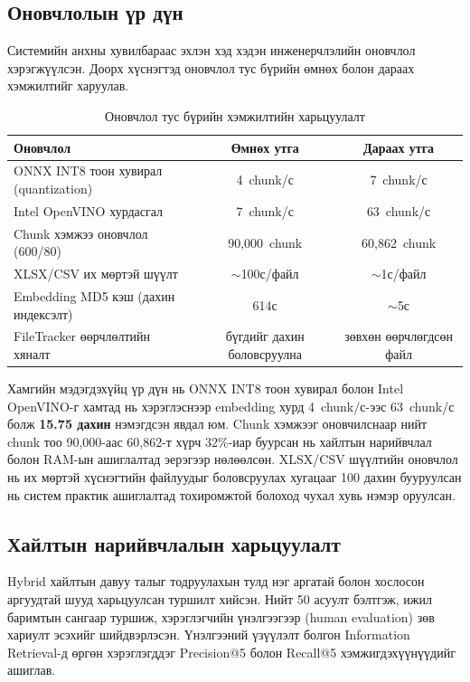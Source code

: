 \documentclass[11pt,a4paper]{article}
\begin{document}
\subsection{Оновчлолын үр дүн}

Системийн анхны хувилбараас эхлэн хэд хэдэн инженерчлэлийн оновчлол хэрэгжүүлсэн. Доорх хүснэгтэд оновчлол тус бүрийн өмнөх болон дараах хэмжилтийг харуулав.

\begin{table}[H]
\centering
\caption{Оновчлол тус бүрийн хэмжилтийн харьцуулалт}
\label{tab:optimization}
\begin{tabular}{|l|c|c|}
\hline
\textbf{Оновчлол} & \textbf{Өмнөх утга} & \textbf{Дараах утга} \\
\hline
ONNX INT8 тоон хувирал (quantization)    & 4~chunk/с    & 7~chunk/с    \\
\hline
Intel OpenVINO хурдасгал                 & 7~chunk/с    & 63~chunk/с   \\
\hline
Chunk хэмжээ оновчлол (600/80)           & 90,000~chunk & 60,862~chunk \\
\hline
XLSX/CSV их мөртэй шүүлт                & $\sim$100с/файл & $\sim$1с/файл \\
\hline
Embedding MD5 кэш (дахин индексэлт)     & 614с         & $\sim$5с     \\
\hline
FileTracker өөрчлөлтийн хяналт          & бүгдийг дахин боловсруулна & зөвхөн өөрчлөгдсөн файл \\
\hline
\end{tabular}
\end{table}

Хамгийн мэдэгдэхүйц үр дүн нь ONNX INT8 тоон хувирал болон Intel OpenVINO-г хамтад нь хэрэглэснээр embedding хурд 4~chunk/с-ээс 63~chunk/с болж \textbf{15.75 дахин} нэмэгдсэн явдал юм. Chunk хэмжээг оновчилснаар нийт chunk тоо 90,000-аас 60,862-т хүрч 32\%-иар буурсан нь хайлтын нарийвчлал болон RAM-ын ашиглалтад эерэгээр нөлөөлсөн. XLSX/CSV шүүлтийн оновчлол нь их мөртэй хүснэгтийн файлуудыг боловсруулах хугацааг 100 дахин бууруулсан нь систем практик ашиглалтад тохиромжтой болоход чухал хувь нэмэр оруулсан.

\subsection{Хайлтын нарийвчлалын харьцуулалт}

Hybrid хайлтын давуу талыг тодруулахын тулд нэг аргатай болон хослосон аргуудтай шууд харьцуулсан туршилт хийсэн. Нийт 50 асуулт бэлтгэж, ижил баримтын сангаар туршиж, хэрэглэгчийн үнэлгээгээр (human evaluation) зөв хариулт эсэхийг шийдвэрлэсэн. Үнэлгээний үзүүлэлт болгон Information Retrieval-д өргөн хэрэглэгддэг Precision@5 болон Recall@5 хэмжигдэхүүнүүдийг ашиглав.
\end{document}
